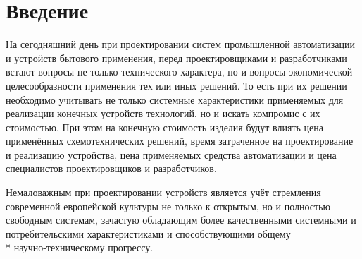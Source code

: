 \section*{Введение}
\begin{par}
На сегодняшний день при проектировании систем промышленной автоматизации и устройств
бытового применения, перед проектировщиками и разработчиками встают вопросы не только технического
характера, но и вопросы экономической целесообразности применения тех или иных решений.
То есть при их решении необходимо учитывать не только системные характеристики применяемых для
реализации конечных устройств технологий, но и искать компромис с их стоимостью. При этом
на конечную стоимость изделия будут влиять цена применённых схемотехнических решений,
время затраченное на проектирование и реализацию устройства, цена применяемых средства автоматизации
и цена специалистов проектировщиков и разработчиков.
\end{par}

\begin{par}
Немаловажным при проектировании устройств является учёт стремления
современной европейской культуры не только к открытым, но и полностью свободным системам,
зачастую обладающим более качественными системными и
потребительскими характеристиками и способствующими общему\\*
научно-техническому прогрессу\cite{lessing}.
\end{par}
\newpage{}

